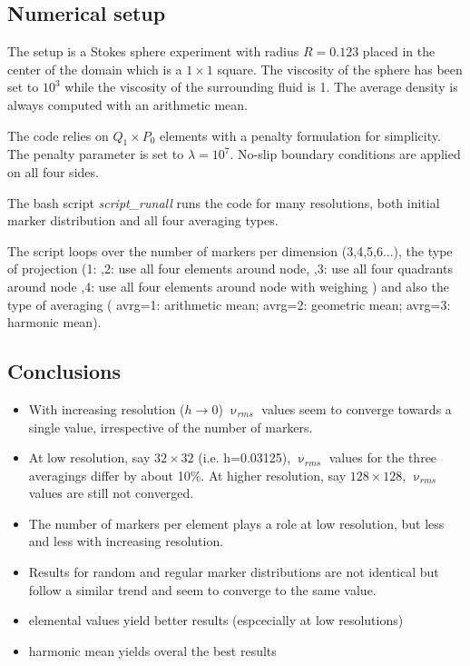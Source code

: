 \subsection*{Numerical setup}

The setup is a Stokes sphere experiment with radius $R=0.123$ placed in the center 
of the domain which is a $1\times 1$ square. 
The viscosity of the sphere has been 
set to $10^3$ while the viscosity of the surrounding fluid is 1. 
The average density is always computed with an arithmetic mean. 

The code relies on $Q_1 \times P_0$ elements with a penalty formulation for simplicity.
The penalty parameter is set to $\lambda=10^7$.
No-slip boundary conditions are applied on all four sides.

The bash script {\sl script\_runall} 
runs the code for many resolutions, both initial marker distribution and all four 
averaging types. 

The script loops over the number of markers per dimension (3,4,5,6...), the type of projection
(1:
,2: use all four elements around node, 
,3: use all four quadrants around node
,4: use all four elements around node with weighing
) and also the type of averaging (
avrg=1: arithmetic mean;
avrg=2: geometric mean;
avrg=3: harmonic mean).


\subsection*{Conclusions}

\begin{itemize}
\item
With increasing resolution ($h\rightarrow 0$) $\upnu_{rms}$ 
values seem to converge towards a single value, irrespective 
of the number of markers. 

\item
At low resolution, say $32\times 32$ (i.e. h=0.03125), $\upnu_{rms}$ 
values for the three averagings differ by about 10\%. 
At higher resolution, say $128\times 128$, $\upnu_{rms}$ 
values are still not converged.  

\item
The number of markers per element plays a role at low resolution, 
but less and less with increasing resolution. 

\item
Results for random and regular marker distributions are not 
identical but follow a similar trend and seem to converge to 
the same value.

\item  elemental values yield better results (espcecially at low resolutions)

\item harmonic mean yields overal the best results
\end{itemize}

